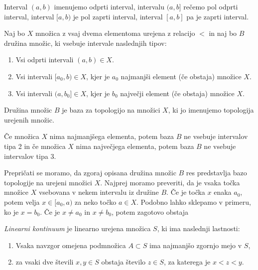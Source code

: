 \documentclass[mat2]{fmfdelo}
\begin{document}
\begin{opomba}\label{op:intervali}
Interval $(a, b)$ imenujemo odprti interval, intervalu $(a, b]$ rečemo pol odprti interval, interval $[a, b)$ je pol zaprti interval, interval $[a, b]$ pa je zaprti interval.
\end{opomba}

\begin{definicija}
Naj bo $X$ množica z vsaj dvema elementoma urejena z relacijo $<$ in naj bo $B$ družina množic, ki vsebuje intervale naslednjih tipov:
\begin{enumerate}
\item Vsi odprti intervali $(a, b) \in X$.
\item Vsi intervali $[a_0, b) \in X$, kjer je $a_0$ najmanjši element (če obstaja) množice $X$.
\item Vsi intervali $(a, b_0] \in X$, kjer je $b_0$ največji element (če obstaja) množice $X$.
\end{enumerate}
Družina množic $B$ je baza za topologijo na množici $X$, ki jo imenujemo topologija urejenih množic.
\end{definicija}

\begin{opomba}\label{op:ekstremi}
Če množica $X$ nima najmanjšega elementa, potem baza $B$ ne vsebuje intervalov tipa 2 in če množica $X$ nima največjega elementa, potem baza $B$ ne vsebuje intervalov tipa 3.
\end{opomba}

Prepričati se moramo, da zgoraj opisana družina množic $B$ res predstavlja bazo topologije na urejeni množici $X$. Najprej moramo preveriti, da je vsaka točka množice $X$ vsebovana v nekem intervalu iz družine $B$. Če je točka $x$ enaka $a_0$, potem velja $x \in [a_0, a)$ za neko točko $a \in X$. Podobno lahko sklepamo v primeru, ko je $x = b_0$. Če je $x \neq a_0$ in $x \neq b_0$, potem zagotovo obstaja

\begin{definicija}
\emph{Linearni kontinuum} je linearno urejena množica $S$, ki ima naslednji lastnosti:
\begin{enumerate}
\item Vsaka navzgor omejena podmnožica $A \subset S$ ima najmanjšo zgornjo mejo v $S$,
\item za vsaki dve števili $x, y \in S$ obstaja število $z \in S$, za katerega je $x<z<y$.
\end{enumerate}
\end{definicija}
\end{document}
